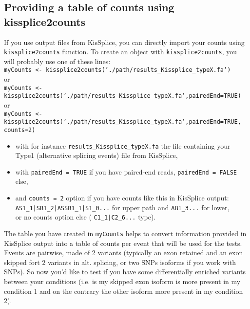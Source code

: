 \documentclass[a4paper,10pt]{article}
\begin{document}

\subsection{Providing a table of counts using kissplice2counts}
If you use output files from KisSplice, you can directly import your counts using \texttt{kissplice2counts} function.
To create an object with \texttt{kissplice2counts}, you will probably use one of these lines:\\

  \texttt{myCounts <- kissplice2counts('./path/results\_Kissplice\_typeX.fa')}\\

or \\
  \texttt{myCounts <- kissplice2counts('./path/results\_Kissplice\_typeX.fa',pairedEnd=TRUE)}\\

or\\
  \texttt{myCounts <- kissplice2counts('./path/results\_Kissplice\_typeX.fa',pairedEnd=TRUE, counts=2)}\\

\begin{itemize}
\item with for instance \texttt{results\_Kissplice\_typeX.fa} the file containing your Type1 (alternative splicing events) file from KisSplice,
 \item  with \texttt{pairedEnd = TRUE} if you have paired-end reads, \texttt{pairedEnd = FALSE} else, 
 \item  and \texttt{counts = 2} option if you have counts like this in KisSplice output:\\
 \texttt{AS1\_1|SB1\_2|ASSB1\_1|S1\_0...} for upper path and \texttt{AB1\_3...} for lower,\\
      or no counts option else ( \texttt{C1\_1|C2\_6...} type).
\end{itemize}

The table you have created in \texttt{myCounts} helps to convert information provided in KisSplice output into a table of counts per event that will be used for the tests.\\
Events are pairwise, made of 2 variants (typically an exon retained and an exon skipped fort 2 variants in alt. splicing, or two SNPs isoforms if you work with SNPs). So now you'd like to test if you have some differentially enriched variants between your conditions (i.e. is my skipped exon isoform is more present in my condition 1 and on the contrary the other isoform more present in my condition 2).
\end{document}
